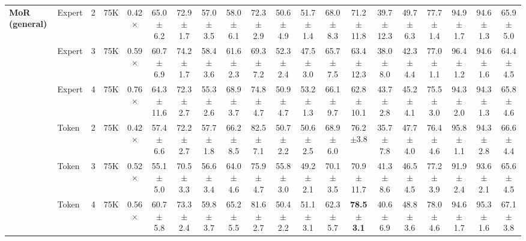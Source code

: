 {\begin{tabular}{l l c c c c c c c c c c c c c c c c c c}
\midrule
\textbf{MoR (general)} & Expert & 2 & 75K & 0.42$\times$ & 65.0{\scriptsize$\pm$6.2} & 72.9{\scriptsize$\pm$1.7} & 57.0{\scriptsize$\pm$3.5} & 58.0{\scriptsize$\pm$6.1} & 72.3{\scriptsize$\pm$2.9} & 50.6{\scriptsize$\pm$4.9} & 51.7{\scriptsize$\pm$1.4} & 68.0{\scriptsize$\pm$8.3} & 71.2{\scriptsize$\pm$11.8} & 39.7{\scriptsize$\pm$12.3} & 49.7{\scriptsize$\pm$6.3} & 77.7{\scriptsize$\pm$1.4} & 94.9{\scriptsize$\pm$1.7} & 94.6{\scriptsize$\pm$1.3} & 65.9{\scriptsize$\pm$5.0} \\
 & Expert & 3 & 75K & 0.59$\times$ & 60.7{\scriptsize$\pm$6.9} & 74.2{\scriptsize$\pm$1.7} & 58.4{\scriptsize$\pm$3.6} & 61.6{\scriptsize$\pm$2.3} & 69.3{\scriptsize$\pm$7.2} & 52.3{\scriptsize$\pm$2.4} & 47.5{\scriptsize$\pm$3.0} & 65.7{\scriptsize$\pm$7.5} & 63.4{\scriptsize$\pm$12.3} & 38.0{\scriptsize$\pm$8.0} & 42.3{\scriptsize$\pm$4.4} & 77.0{\scriptsize$\pm$1.1} & 96.4{\scriptsize$\pm$1.2} & 94.6{\scriptsize$\pm$1.6} & 64.4{\scriptsize$\pm$4.5} \\
 & Expert & 4 & 75K & 0.76$\times$ & 64.3{\scriptsize$\pm$11.6} & 72.3{\scriptsize$\pm$2.7} & 55.3{\scriptsize$\pm$2.6} & 68.9{\scriptsize$\pm$3.7} & 74.8{\scriptsize$\pm$4.7} & 50.9{\scriptsize$\pm$4.7} & 53.2{\scriptsize$\pm$1.3} & 66.1{\scriptsize$\pm$9.7} & 62.8{\scriptsize$\pm$10.1} & 43.7{\scriptsize$\pm$2.8} & 45.2{\scriptsize$\pm$4.1} & 75.5{\scriptsize$\pm$3.0} & 94.3{\scriptsize$\pm$2.0} & 94.3{\scriptsize$\pm$1.3} & 65.8{\scriptsize$\pm$4.6} \\
 & Token & 2 & 75K & 0.42$\times$ & 57.4{\scriptsize$\pm$6.6} & 72.2{\scriptsize$\pm$2.7} & 57.7{\scriptsize$\pm$1.8} & 66.2{\scriptsize$\pm$8.5} & 82.5{\scriptsize$\pm$7.1} & 50.7{\scriptsize$\pm$2.2} & 50.6{\scriptsize$\pm$2.5} & 68.9{\scriptsize$\pm$6.0} & 76.2{\scriptsize$\pm$3.8} & 35.7{\scriptsize$\pm$7.8} & 47.7{\scriptsize$\pm$4.0} & 76.4{\scriptsize$\pm$4.6} & 95.8{\scriptsize$\pm$1.1} & 94.3{\scriptsize$\pm$2.8} & 66.6{\scriptsize$\pm$4.4} \\
 & Token & 3 & 75K & 0.52$\times$ & 55.1{\scriptsize$\pm$5.0} & 70.5{\scriptsize$\pm$3.3} & 56.6{\scriptsize$\pm$3.4} & 64.0{\scriptsize$\pm$4.6} & 75.9{\scriptsize$\pm$4.7} & 55.8{\scriptsize$\pm$3.0} & 49.2{\scriptsize$\pm$2.1} & 70.1{\scriptsize$\pm$3.5} & 70.9{\scriptsize$\pm$11.7} & 41.3{\scriptsize$\pm$8.6} & 46.5{\scriptsize$\pm$4.5} & 77.2{\scriptsize$\pm$3.9} & 91.9{\scriptsize$\pm$2.4} & 93.6{\scriptsize$\pm$2.1} & 65.6{\scriptsize$\pm$4.5} \\
 & Token & 4 & 75K & 0.56$\times$ & 60.7{\scriptsize$\pm$5.8} & 73.3{\scriptsize$\pm$2.4} & 59.8{\scriptsize$\pm$3.7} & 65.2{\scriptsize$\pm$5.5} & 81.6{\scriptsize$\pm$2.7} & 50.4{\scriptsize$\pm$2.2} & 51.1{\scriptsize$\pm$3.1} & 62.3{\scriptsize$\pm$5.7} & \cellcolor{bestgreen}\textbf{78.5{\scriptsize$\pm$3.1}} & 40.6{\scriptsize$\pm$6.9} & 48.8{\scriptsize$\pm$3.6} & 78.0{\scriptsize$\pm$4.6} & 94.6{\scriptsize$\pm$1.7} & 95.3{\scriptsize$\pm$1.6} & 67.1{\scriptsize$\pm$3.8} \\

\end{tabular}}
